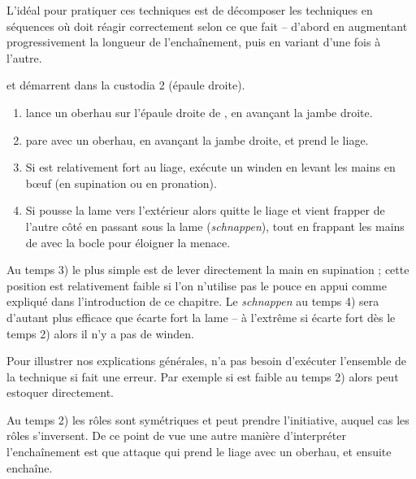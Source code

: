 L'idéal pour pratiquer ces techniques est de décomposer les techniques en séquences où \A doit réagir correctement selon ce que fait \D – d'abord en augmentant progressivement la longueur de l'enchaînement, puis en variant d'une fois à l'autre.


\begin{technique}[Liegniczer 1]
\label{épée-bocle:tech:liegniczer:1}

\A et \D démarrent dans la custodia 2 (épaule droite).

\begin{enumerate}
	\item \A lance un oberhau sur l'épaule droite de \D, en avançant la jambe droite.
	
	\item \D pare avec un oberhau, en avançant la jambe droite, et prend le liage.
	
	\item {}
		Si \D est relativement fort au liage, \A exécute un winden en levant les mains en bœuf (en supination ou en pronation).
	
	\item {}
		Si \D pousse la lame vers l'extérieur alors \A quitte le liage et vient frapper \D de l'autre côté en passant sous la lame (\emph{schnappen}),
		tout en frappant les mains de \D avec la bocle pour éloigner la menace.
\end{enumerate}

Au temps 3) le plus simple est de lever directement la main en supination ; cette position est relativement faible si l'on n'utilise pas le pouce en appui comme expliqué dans l'introduction de ce chapitre.
Le \emph{schnappen} au temps 4) sera d'autant plus efficace que \D écarte fort la lame – à l'extrême si \D écarte fort dès le temps 2) alors il n'y a pas de winden.

Pour illustrer nos explications générales, \A n'a pas besoin d'exécuter l'ensemble de la technique si \D fait une erreur.
Par exemple si \D est faible au temps 2) alors \A peut estoquer directement.

Au temps 2) les rôles sont symétriques et \D peut prendre l'initiative, auquel cas les rôles s'inversent.
De ce point de vue une autre manière d'interpréter l'enchaînement est que \D attaque \A qui prend le liage avec un oberhau, et ensuite enchaîne.

\end{technique}


